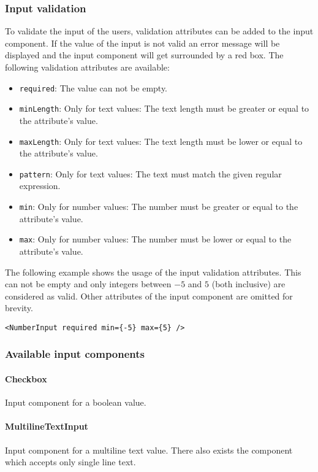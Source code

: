 \subsubsection*{Input validation}
To validate the input of the users, validation attributes can be added to the input component. 
If the value of the input is not valid an error message will be displayed and the input component will get surrounded by a red box. 
The following validation attributes are available:
\begin{itemize}
  \item \texttt{required}: The value can not be empty.
  \item \texttt{minLength}: Only for text values: The text length must be greater or equal to the attribute's value.
  \item \texttt{maxLength}: Only for text values: The text length must be lower or equal to the attribute's value.
  \item \texttt{pattern}: Only for text values: The text must match the given regular expression.
  \item \texttt{min}: Only for number values: The number must be greater or equal to the attribute's value.
  \item \texttt{max}: Only for number values: The number must be lower or equal to the attribute's value.
\end{itemize}

The following example shows the usage of the input validation attributes. 
This  can not be empty and only integers between $-5$ and $5$ (both inclusive) are considered as valid.
Other attributes of the input component are omitted for brevity.
\begin{verbatim}
<NumberInput required min={-5} max={5} />
\end{verbatim}

\subsubsection*{Available input components}
\paragraph{Checkbox}
\label{sec:component-checkbox}
Input component for a boolean value.

\paragraph{MultilineTextInput}
\label{sec:component-multiline-text-input}
Input component for a multiline text value. 
There also exists the  component which accepts only single line text.

